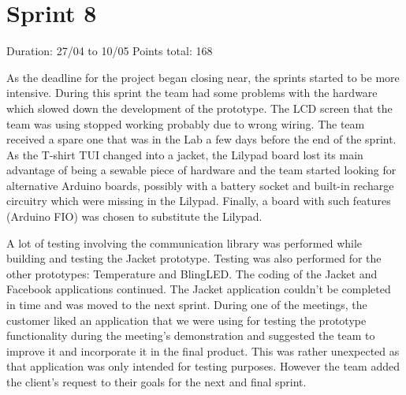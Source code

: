 \newpage

\section{Sprint 8}

Duration: 27/04 to 10/05\newline
Points total: 168

As the deadline for the project began closing near, the sprints started to be
more intensive. During this sprint the team had some problems with the hardware
which slowed down the development of the prototype. The LCD screen that the team
was using stopped working probably due to wrong wiring. The team received a
spare one that was in the Lab a few days before the end of the sprint. As the
T-shirt TUI changed into a jacket, the Lilypad board lost its main advantage
of being a sewable piece of hardware and the team started looking for alternative
Arduino boards, possibly with a battery socket and built-in recharge circuitry
which were missing in the Lilypad. Finally, a board with such features
(Arduino FIO) was chosen to substitute the Lilypad.

A lot of testing involving
the communication library was performed while building and testing the Jacket prototype.
Testing was also performed for the other prototypes: Temperature and BlingLED.
The coding of the Jacket and Facebook applications continued.
The Jacket application couldn't be completed in time and was moved to the next
sprint. During one of the meetings, the customer liked an application that we
were using for testing the prototype functionality during the meeting's
demonstration and suggested the team to improve it and incorporate it in the
final product. This was rather unexpected as that application was only intended
for testing purposes. However the team added the client's request to their goals
for the next and final sprint.

